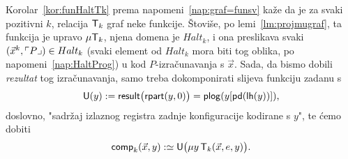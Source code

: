 Korolar~\ref{kor:funHaltTk} prema napomeni~\ref{nap:graf=funsv} kaže da je za svaki pozitivni $k$, relacija $\mathsf T_k$ graf neke funkcije. Štoviše, po lemi~\ref{lm:projmugraf}, ta funkcija je upravo $\mu\mathsf T_k$, njena domena je $Halt_k$, i ona preslikava svaki $(\vec x^k,\ulcorner P\lrcorner)\in Halt_k$ (svaki element od $Halt_k$ mora biti tog oblika, po napomeni~\ref{nap:HaltProg}) u kod $P$-izračunavanja s $\vec x$. Sada, da bismo dobili \emph{rezultat} tog izračunavanja, samo treba dokomponirati slijeva funkciju zadanu s
\begin{equation}\label{eq:Udef}
    \mathsf U(y):=\mathsf{result}\bigl(\mathsf{rpart}(y,0)\bigr)=\mathsf{plog}(y[\mathsf{pd}(\mathsf{lh}(y))])\text,
\end{equation}
doslovno, "sadržaj izlaznog registra zadnje konfiguracije kodirane s $y$", te ćemo dobiti
\begin{equation}
    \mathsf{comp}_k(\vec x,y):\simeq \mathsf U\bigl(\mu y\,\mathsf T_k(\vec x,e,y)\bigr)\text.
\end{equation}


